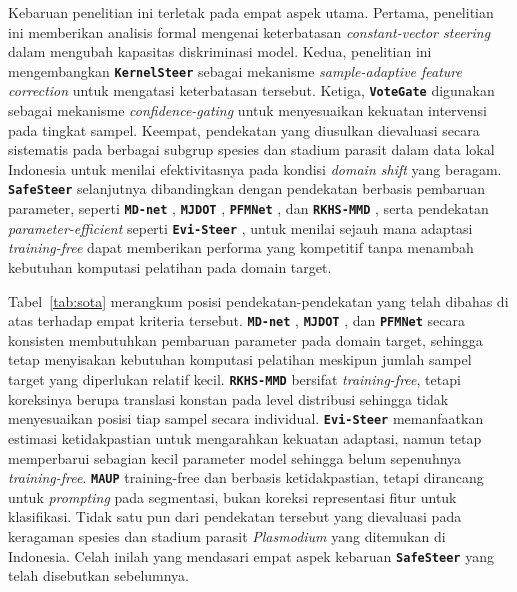 \documentclass[conference]{IEEEtran}
\newcommand{\nama}[1]{\textbf{\texttt{#1}}}
\begin{document}
Kebaruan penelitian ini terletak pada empat aspek utama. Pertama, penelitian ini memberikan analisis formal mengenai keterbatasan \textit{constant-vector steering} dalam mengubah kapasitas diskriminasi model. Kedua, penelitian ini mengembangkan \nama{KernelSteer} sebagai mekanisme \textit{sample-adaptive feature correction} untuk mengatasi keterbatasan tersebut. Ketiga, \nama{VoteGate} digunakan sebagai mekanisme \textit{confidence-gating} untuk menyesuaikan kekuatan intervensi pada tingkat sampel. Keempat, pendekatan yang diusulkan dievaluasi secara sistematis pada berbagai subgrup spesies dan stadium parasit dalam data lokal Indonesia untuk menilai efektivitasnya pada kondisi \textit{domain shift} yang beragam. \nama{SafeSteer} selanjutnya dibandingkan dengan pendekatan berbasis pembaruan parameter, seperti \nama{MD-net} \cite{b2}, \nama{MJDOT} \cite{b7}, \nama{PFMNet} \cite{b8}, dan \nama{RKHS-MMD} \cite{b14}, serta pendekatan \textit{parameter-efficient} seperti \nama{Evi-Steer} \cite{b12}, untuk menilai sejauh mana adaptasi \textit{training-free} dapat memberikan performa yang kompetitif tanpa menambah kebutuhan komputasi pelatihan pada domain target.

Tabel~\ref{tab:sota} merangkum posisi pendekatan-pendekatan yang telah dibahas di atas terhadap empat kriteria tersebut. \nama{MD-net} \cite{b2}, \nama{MJDOT} \cite{b7}, dan \nama{PFMNet} \cite{b8} secara konsisten membutuhkan pembaruan parameter pada domain target, sehingga tetap menyisakan kebutuhan komputasi pelatihan meskipun jumlah sampel target yang diperlukan relatif kecil. \nama{RKHS-MMD} \cite{b14} bersifat \textit{training-free}, tetapi koreksinya berupa translasi konstan pada level distribusi sehingga tidak menyesuaikan posisi tiap sampel secara individual. \nama{Evi-Steer} \cite{b12} memanfaatkan estimasi ketidakpastian untuk mengarahkan kekuatan adaptasi, namun tetap memperbarui sebagian kecil parameter model sehingga belum sepenuhnya \textit{training-free}. \nama{MAUP} \cite{b13} training-free dan berbasis ketidakpastian, tetapi dirancang untuk \textit{prompting} pada segmentasi, bukan koreksi representasi fitur untuk klasifikasi. Tidak satu pun dari pendekatan tersebut yang dievaluasi pada keragaman spesies dan stadium parasit \textit{Plasmodium} yang ditemukan di Indonesia. Celah inilah yang mendasari empat aspek kebaruan \nama{SafeSteer} yang telah disebutkan sebelumnya.
\end{document}
